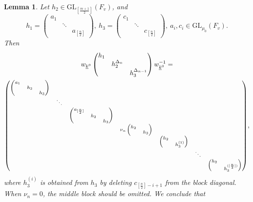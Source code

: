 \documentclass[12pts]{amsart}
\newcommand{\GL}{{\mathrm{GL}}}
\newtheorem{lem}[thm]{Lemma}
\begin{document}
\begin{lem}\label{lem 13.5}
Let $h_2\in \GL_{[\frac{m+1}{2}]}(F_v)$, and
$$
h_1=\begin{pmatrix}a_1\\&\ddots\\&&a_{[\frac{n}{2}]}\end{pmatrix},\ 
h_3=\begin{pmatrix}c_1\\&\ddots\\&&c_{[\frac{n}{2}]}\end{pmatrix},\
a_i,c_i\in \GL_{\mu_0}(F_v).
$$
Then
\begin{multline}\label{13.18}
w_{\underline{k}^0}\begin{pmatrix}h_1\\&h_2^{\Delta_n}\\&&h_3^{\Delta_{n-1}}\end{pmatrix}w^{-1}_{\underline{k}^0}=\\
\scriptsize{\begin{pmatrix}\begin{pmatrix}a_1\\&h_2\\&&h_3\end{pmatrix}\\&\ddots\\&&\begin{pmatrix}a_{[\frac{n}{2}]}\\&h_2\\&&h_3\end{pmatrix}\\&&&\nu_n\begin{pmatrix}h_2\\&h_3\end{pmatrix}\\&&&&\begin{pmatrix}h_2\\&h^{(1)}_3\end{pmatrix}\\&&&&&\ddots\\&&&&&&\begin{pmatrix}h_2\\&h^{([\frac{n}{2}])}_3\end{pmatrix}\end{pmatrix}},
\end{multline}
where $h_3^{(i)}$ is obtained from $h_3$ by deleting $c_{[\frac{n}{2}]-i+1}$ from the block diagonal. When $\nu_n=0$, the middle block should be omitted. We conclude that
\begin{multline}\label{13.19}

\end{multline}
\end{lem}
\end{document}
